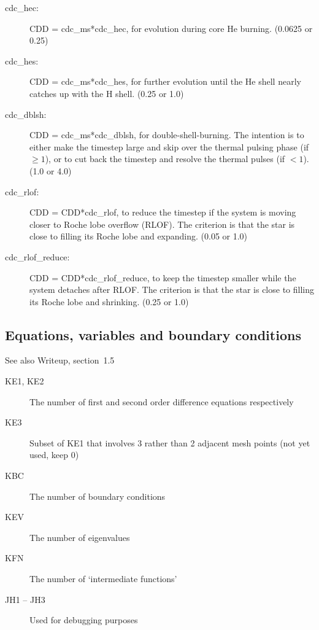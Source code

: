 \begin{description}
\begin{description}
  \item[cdc\_hec:]\hypertarget{cdc_hec}{}  CDD = cdc\_ms*cdc\_hec, for evolution during core He burning.  (0.0625 or 0.25)
  \item[cdc\_hes:]\hypertarget{cdc_hes}{}  CDD = cdc\_ms*cdc\_hes, for further evolution until the He shell nearly catches up with the H shell.  (0.25 or 1.0)
  \item[cdc\_dblsh:]\hypertarget{cdc_dblsh}{}  CDD = cdc\_ms*cdc\_dblsh, for double-shell-burning. The intention is to either make the timestep large and skip over the thermal pulsing phase (if $\ge1$), or to cut back the timestep and resolve the thermal pulses (if $< 1$). (1.0 or 4.0)
  \item[cdc\_rlof:]\hypertarget{cdc_rlof}{}  CDD = CDD*cdc\_rlof, to reduce the timestep if the system is moving closer to Roche lobe overflow (RLOF). The criterion is that the star is close to filling its Roche lobe and expanding. (0.05 or 1.0) 
  \item[cdc\_rlof\_reduce:]\hypertarget{cdc_rlof_reduce}{}  CDD = CDD*cdc\_rlof\_reduce, to keep the timestep smaller while the system detaches after RLOF. The criterion is that the star is close to filling its Roche lobe and shrinking. (0.25 or 1.0)
  \end{description}
\end{description}




\subsection{Equations, variables and boundary conditions}
\label{sec:initdat:eqvarbc}

See also Writeup, section~1.5
\begin{description}
\item[KE1, KE2]\hypertarget{ke1}{}\hypertarget{ke2}{} The number of first and second order difference equations respectively
\item[KE3]\hypertarget{ke3}{} Subset of KE1 that involves 3 rather than 2 adjacent mesh points (not yet used, keep 0)
\item[KBC]\hypertarget{kbc}{} The number of boundary conditions
\item[KEV]\hypertarget{kev}{} The number of eigenvalues
\item[KFN]\hypertarget{kfn}{} The number of `intermediate functions'
\item[JH1 -- JH3]\hypertarget{jh1}{}\hypertarget{jh2}{}\hypertarget{jh3}{} Used for debugging purposes
\end{description}





